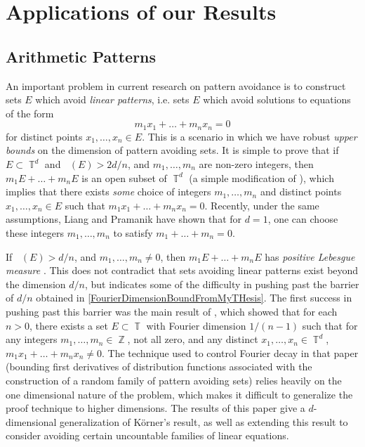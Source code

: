 \documentclass[dvipsnames,letterpaper,12pt]{article}
\numberwithin{equation}{section}
\DeclareMathOperator{\fordim}{\dim_{\mathbb{F}}}
\DeclareMathOperator{\ZZ}{\mathbb{Z}}
\DeclareMathOperator{\TT}{\mathbb{T}}
\numberwithin{theorem}{section}
\begin{document}
\section{Applications of our Results} \label{ApplicationsSection}

\subsection{Arithmetic Patterns}

An important problem in current research on pattern avoidance is to construct sets $E$ which avoid \emph{linear patterns}, i.e. sets $E$ which avoid solutions to equations of the form
%
\begin{equation}
    m_1x_1 + \dots + m_nx_n = 0
\end{equation}
%
for distinct points $x_1,\dots,x_n \in E$.
%
%
This is a scenario in which we have robust \emph{upper bounds} on the dimension of pattern avoiding sets. It is simple to prove that if $E \subset \TT^d$ and $\fordim(E) > 2d/n$, and $m_1,\dots,m_n$ are non-zero integers, then $m_1 E + \dots + m_n E$ is an open subset of $\TT^d$ (a simple modification of \cite[Proposition 3.14]{MattilaFourier}), which implies that there exists \emph{some} choice of integers $m_1,\dots,m_n$ and distinct points $x_1,\dots,x_n \in E$ such that $m_1x_1 + \dots + m_nx_n = 0$. Recently, under the same assumptions, Liang and Pramanik have shown \cite{LiangPramanik} that for $d = 1$, one can choose these integers $m_1,\dots,m_n$ to satisfy $m_1 + \dots + m_n = 0$.

If $\fordim(E) > d/n$, and $m_1,\dots,m_n \neq 0$, then $m_1 E + \dots + m_n E$ has \emph{positive Lebesgue measure} \cite[Proposition 3.14]{MattilaFourier}. This does not contradict that sets avoiding linear patterns exist beyond the dimension $d/n$, but indicates some of the difficulty in pushing past the barrier of $d/n$ obtained in \eqref{FourierDimensionBoundFromMyTHesis}. The first success in pushing past this barrier was the main result of \cite{Korner2}, which showed that for each $n > 0$, there exists a set $E \subset \TT$ with Fourier dimension $1/(n-1)$ such that for any integers $m_1,\dots,m_n \in \ZZ$, not all zero, and any distinct $x_1,\dots,x_n \in \TT^d$, $m_1x_1 + \dots + m_nx_n \neq 0$. The technique used to control Fourier decay in that paper (bounding first derivatives of distribution functions associated with the construction of a random family of pattern avoiding sets) relies heavily on the one dimensional nature of the problem, which makes it difficult to generalize the proof technique to higher dimensions. The results of this paper give a $d$-dimensional generalization of K\"{o}rner's result, as well as extending this result to consider avoiding certain uncountable families of linear equations.
\end{document}
